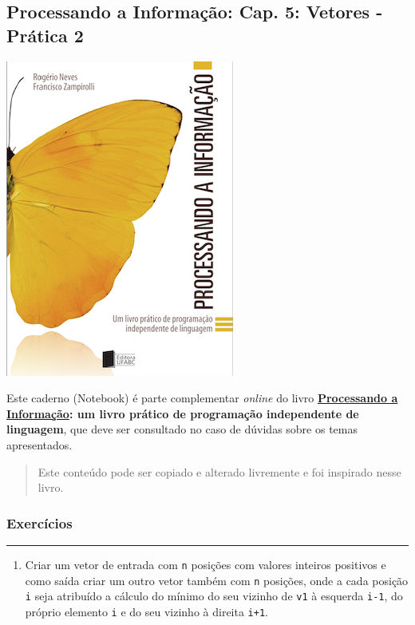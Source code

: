 \documentclass[12pt,a4paper]{article}
\providecommand{\tightlist}{%
      \setlength{\itemsep}{0pt}\setlength{\parskip}{0pt}}
\begin{document}
    \hypertarget{processando-a-informauxe7uxe3o-cap.-5-vetores---pruxe1tica-2}{%
\subsection{Processando a Informação: Cap. 5: Vetores - Prática
2}\label{processando-a-informauxe7uxe3o-cap.-5-vetores---pruxe1tica-2}}

    \includegraphics{"figs/Capa_Processando_Informacao.jpg"}

Este caderno (Notebook) é parte complementar \emph{online} do livro
\textbf{\href{https://editora.ufabc.edu.br/matematica-e-ciencias-da-computacao/58-processando-a-informacao}{Processando
a Informação}: um livro prático de programação independente de
linguagem}, que deve ser consultado no caso de dúvidas sobre os temas
apresentados.

\begin{quote}
Este conteúdo pode ser copiado e alterado livremente e foi inspirado
nesse livro.
\end{quote}

    \hypertarget{exercuxedcios}{%
\subsubsection{Exercícios}\label{exercuxedcios}}

    \begin{center}\rule{0.5\linewidth}{0.5pt}\end{center}

\begin{enumerate}
\def\labelenumi{\arabic{enumi}.}
\tightlist
\item
  Criar um vetor de entrada com \texttt{n} posições com valores inteiros
  positivos e como saída criar um outro vetor também com \texttt{n}
  posições, onde a cada posição \texttt{i} seja atribuído a cálculo do
  mínimo do seu vizinho de \texttt{v1} à esquerda \texttt{i-1}, do
  próprio elemento \texttt{i} e do seu vizinho à direita \texttt{i+1}.
\end{enumerate}
\end{document}
